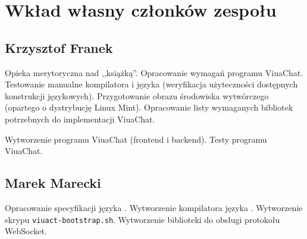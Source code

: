 \chapter{Wkład własny członków zespołu}
\label{wklad_wlasny}

\section{Krzysztof Franek}

Opieka merytoryczna nad ,,książką''.
Opracowanie wymagań programu ViuaChat.
Testowanie manualne kompilatora i języka (weryfikacja użyteczności dostępnych
konstrukcji językowych).
Przygotowanie obrazu środowiska wytwórczego (opartego o dystrybucję Linux Mint).
Opracowanie listy wymaganych bibliotek potrzebnych do implementacji ViuaChat.

Wytworzenie programu ViuaChat (frontend i backend).
Testy programu ViuaChat.

\section{Marek Marecki}

Opracowanie specyfikacji języka \ViuAct.
Wytworzenie kompilatora języka \ViuAct.
Wytworzenie skrypu \texttt{viuact-bootstrap.sh}.
Wytworzenie biblioteki do obsługi protokołu WebSocket.
